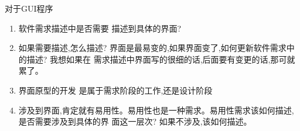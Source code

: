 \documentclass[11pt]{article}
\begin{document}
\begin{staff}

\slogo 对于GUI程序
\begin{enumerate}
  \item 软件需求描述中是否需要 描述到具体的界面?

  \item 如果需要描述,怎么描述? 界面是最易变的,如果界面变了,如何更新软件需求中的描述? 我想如果在
需求描述中界面写的很细的话,后面要有变更的话,那可就累了。

  \item 界面原型的开发 是属于需求阶段的工作,还是设计阶段

  \item 涉及到界面,肯定就有易用性。易用性也是一种需求。易用性需求该如何描述,是否需要涉及到具体的界
面这一层次? 如果不涉及,该如何描述。
\end{enumerate}
\end{staff}
\end{document}
